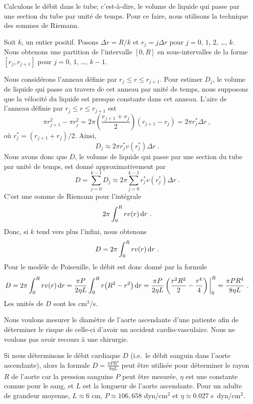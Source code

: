 {

Calculons le débit dans le tube; c'est-à-dire, le volume de liquide
qui passe par une section du tube par unité de temps.  Pour ce faire, nous
utilisons la technique des sommes de Riemann.

Soit $k$, un entier positif.  Posons $\Delta r = R/k$ et
$r_j = j \Delta r$ pour $j=0$, $1$, $2$, \ldots, $k$.  Nous obtenons une
partition de l'intervalle $[0,R]$ en sous-intervalles de la forme
$[r_j,r_{j+1}]$ pour $j=0$, $1$, \ldots, $k-1$.

Nous considérons l'anneau définie par $r_j \leq r \leq r_{j+1}$.  Pour estimer
$D_j$, le volume de liquide qui passe au travers de cet anneau par unité de
temps, nous supposons que la vélocité du liquide est presque constante
dans cet anneau.  L'aire de l'anneau définie par
$r_j \leq r \leq r_{j+1}$ est
\[
\pi r_{j+1}^2 - \pi r_j^2 = 2\pi \left(\frac{r_{j+1}+r_j}{2} \right)
(r_{j+1}-r_j) = 2\pi r_j^\ast \Delta r \ ,
\]
où $r_j^\ast = (r_{j+1}+r_j)/2$.  Ainsi,
\[
D_j \approx 2\pi r_j^\ast v(r_j^\ast) \Delta r \ .
\]
Nous avons donc que $D$, le volume de liquide qui passe par une
section du tube par unité de temps, est donné approximativement par
\[
D = \sum_{j=0}^{k-1} D_j \approx 2\pi \sum_{j=0}^{k-1} 
r_j^\ast v(r_j^\ast) \Delta r \ .
\]
C'est une somme de Riemann pour l'intégrale
\[
2\pi \int_0^R r v(r) \,\mathrm{d}r \ .
\]
Donc, si $k$ tend vers plus l'infini, nous obtenons
\[
D = 2\pi \int_0^R r v(r) \,\mathrm{d}r \ .
\]
Pour le modèle de Poiseuille, le débit est donc donné par la formule
\[
D = 2\pi \int_0^R r v(r) \,\mathrm{d}r 
= \frac{\pi P}{2\eta L} \int_0^R r \big( R^2-r^2\big) \,\mathrm{d}r
= \frac{\pi P}{2\eta L} \left(\frac{r^2R^2}{2}-\frac{r^4}{4}\right)\bigg|_0^R
= \frac{\pi P R^4}{8\eta L} \ .
\]
Les unités de $D$ sont les cm$^3$/s.

\begin{egg}
Nous voulons mesurer le diamètre de l'aorte ascendante d'une
patiente afin de déterminer le risque de celle-ci d'avoir un accident
cardio-vasculaire.  Nous ne voulons pas avoir recours à une chirurgie.

Si nous déterminons le débit cardiaque $D$ (i.e.\ le débit sanguin
dans l'aorte ascendante), alors la formule
$\displaystyle D = \frac{\pi P  R^4}{8\eta L}$ 
peut être utilisée pour déterminer le rayon $R$ de l'aorte car la pression
sanguine $P$ peut être mesurée, $\eta$ est une constante connue pour le sang,
et $L$ est la longueur de l'aorte ascendante.  Pour un adulte de grandeur
moyenne, $L \approx 6$ cm, $P \approx 106,658$ dyn/cm$^2$ et
$\eta \approx 0.027$ \mbox{s\ dyn/cm$^2$}.


\end{egg}}
